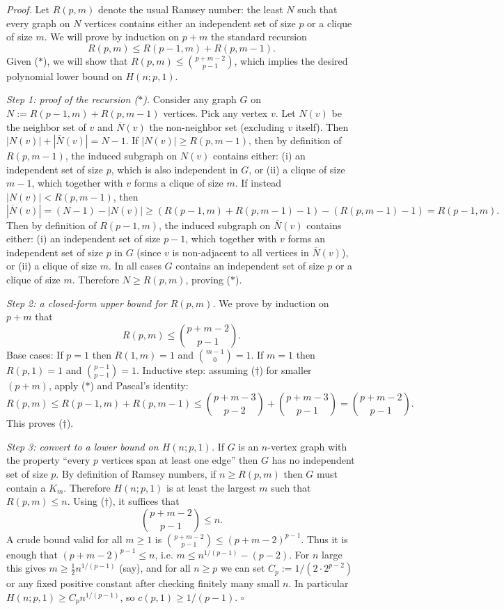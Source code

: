 \noindent\emph{Proof.}
Let $R(p,m)$ denote the usual Ramsey number: the least $N$ such that every graph on $N$ vertices contains either an independent set of size $p$ or a clique of size $m$.
We will prove by induction on $p+m$ the standard recursion
\begin{equation}
R(p,m)\le R(p-1,m)+R(p,m-1).
\tag{$\ast$}
\end{equation}
Given ($\ast$), we will show that $R(p,m)\le \binom{p+m-2}{p-1}$, which implies the desired polynomial lower bound on $H(n;p,1)$.

\emph{Step 1: proof of the recursion ($\ast$).}
Consider any graph $G$ on $N:=R(p-1,m)+R(p,m-1)$ vertices.
Pick any vertex $v$.
Let $N(v)$ be the neighbor set of $v$ and $\overline{N}(v)$ the non-neighbor set (excluding $v$ itself).
Then $|N(v)|+|\overline{N}(v)|=N-1$.
If $|N(v)|\ge R(p,m-1)$, then by definition of $R(p,m-1)$, the induced subgraph on $N(v)$ contains either:
(i) an independent set of size $p$, which is also independent in $G$, or
(ii) a clique of size $m-1$, which together with $v$ forms a clique of size $m$.
If instead $|N(v)|<R(p,m-1)$, then
\[
|\overline{N}(v)| = (N-1)-|N(v)| \ge (R(p-1,m)+R(p,m-1)-1) - (R(p,m-1)-1)=R(p-1,m).
\]
Then by definition of $R(p-1,m)$, the induced subgraph on $\overline{N}(v)$ contains either:
(i) an independent set of size $p-1$, which together with $v$ forms an independent set of size $p$ in $G$ (since $v$ is non-adjacent to all vertices in $\overline{N}(v)$), or
(ii) a clique of size $m$.
In all cases $G$ contains an independent set of size $p$ or a clique of size $m$.
Therefore $N\ge R(p,m)$, proving ($\ast$).

\emph{Step 2: a closed-form upper bound for $R(p,m)$.}
We prove by induction on $p+m$ that
\begin{equation}
R(p,m) \le \binom{p+m-2}{p-1}.
\tag{$\dagger$}
\end{equation}
Base cases: If $p=1$ then $R(1,m)=1$ and $\binom{m-1}{0}=1$.
If $m=1$ then $R(p,1)=1$ and $\binom{p-1}{p-1}=1$.
Inductive step: assuming ($\dagger$) for smaller $(p+m)$, apply ($\ast$) and Pascal's identity:
\[
R(p,m)\le R(p-1,m)+R(p,m-1)
\le \binom{p+m-3}{p-2}+\binom{p+m-3}{p-1}
=\binom{p+m-2}{p-1}.
\]
This proves ($\dagger$).

\emph{Step 3: convert to a lower bound on $H(n;p,1)$.}
If $G$ is an $n$-vertex graph with the property ``every $p$ vertices span at least one edge'' then $G$ has no independent set of size $p$.
By definition of Ramsey numbers, if $n\ge R(p,m)$ then $G$ must contain a $K_m$.
Therefore $H(n;p,1)$ is at least the largest $m$ such that $R(p,m)\le n$.
Using ($\dagger$), it suffices that
\[
\binom{p+m-2}{p-1}\le n.
\]
A crude bound valid for all $m\ge 1$ is
\(
\binom{p+m-2}{p-1} \le (p+m-2)^{p-1}.
\)
Thus it is enough that $(p+m-2)^{p-1}\le n$, i.e. $m\le n^{1/(p-1)}-(p-2)$.
For $n$ large this gives $m\ge \tfrac12 n^{1/(p-1)}$ (say), and for all $n\ge p$ we can set
$C_p := 1/(2\cdot 2^{p-2})$ or any fixed positive constant after checking finitely many small $n$.
In particular $H(n;p,1)\ge C_p n^{1/(p-1)}$, so $c(p,1)\ge 1/(p-1)$.
\hfill$\square$

